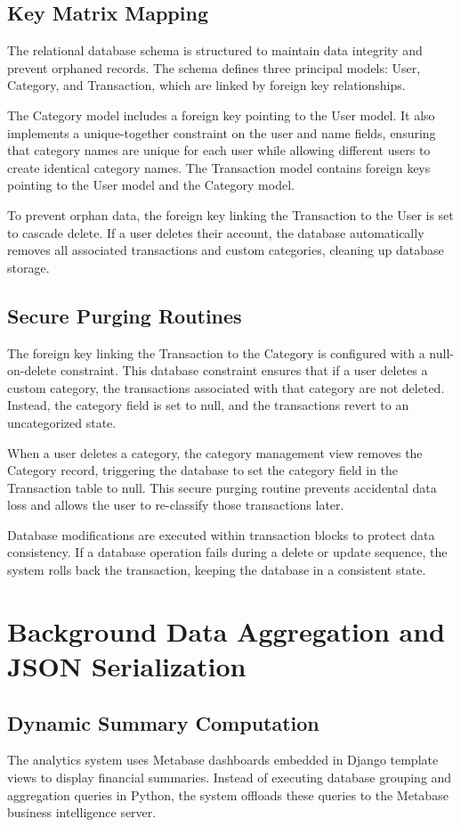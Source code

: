 \subsection{Key Matrix Mapping}
The relational database schema is structured to maintain data integrity and prevent orphaned records. The schema defines three principal models: User, Category, and Transaction, which are linked by foreign key relationships.

The Category model includes a foreign key pointing to the User model. It also implements a unique-together constraint on the user and name fields, ensuring that category names are unique for each user while allowing different users to create identical category names. The Transaction model contains foreign keys pointing to the User model and the Category model.

To prevent orphan data, the foreign key linking the Transaction to the User is set to cascade delete. If a user deletes their account, the database automatically removes all associated transactions and custom categories, cleaning up database storage.

\subsection{Secure Purging Routines}
The foreign key linking the Transaction to the Category is configured with a null-on-delete constraint. This database constraint ensures that if a user deletes a custom category, the transactions associated with that category are not deleted. Instead, the category field is set to null, and the transactions revert to an uncategorized state.

When a user deletes a category, the category management view removes the Category record, triggering the database to set the category field in the Transaction table to null. This secure purging routine prevents accidental data loss and allows the user to re-classify those transactions later.

Database modifications are executed within transaction blocks to protect data consistency. If a database operation fails during a delete or update sequence, the system rolls back the transaction, keeping the database in a consistent state.

\section{Background Data Aggregation and JSON Serialization}
\subsection{Dynamic Summary Computation}
The analytics system uses Metabase dashboards embedded in Django template views to display financial summaries. Instead of executing database grouping and aggregation queries in Python, the system offloads these queries to the Metabase business intelligence server.

